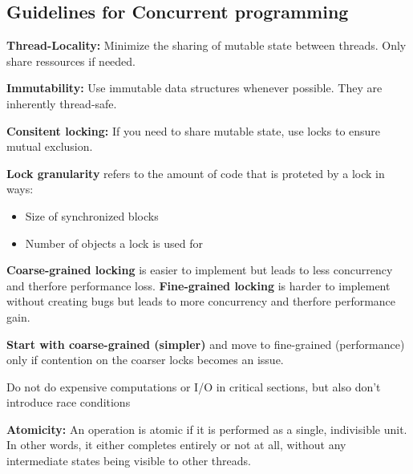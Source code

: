 \subsection{Guidelines for Concurrent programming}

\begin{important}
    \textbf{Thread-Locality:} Minimize the sharing of mutable state between threads. Only share ressources if needed.
\end{important}

\begin{important}
    \textbf{Immutability:} Use immutable data structures whenever possible. They are inherently thread-safe.
\end{important}

\begin{important}
    \textbf{Consitent locking:} If you need to share mutable state, use locks to ensure mutual exclusion.
\end{important}

\begin{definition}
    \textbf{Lock granularity } refers to the amount of code that is proteted by a lock in ways:
    \begin{itemize}
        \item Size of synchronized blocks
        \item Number of objects a lock is used for
    \end{itemize}
\end{definition}

\begin{theorem}
    \textbf{Coarse-grained locking} is easier to implement but leads to less concurrency and therfore performance loss. \textbf{Fine-grained locking} is harder to implement without creating bugs but leads to more concurrency and therfore performance gain.
\end{theorem}

\begin{important}
    \textbf{Start with coarse-grained (simpler)} and move to fine-grained (performance) only if contention on the coarser locks becomes an issue.
\end{important}

\begin{important}
    Do not do expensive computations or I/O in critical sections, but also don’t introduce race conditions
\end{important}

\begin{definition}
    \textbf{Atomicity: } An operation is atomic if it is performed as a single, indivisible unit. In other words, it either completes entirely or not at all, without any intermediate states being visible to other threads.
\end{definition}
